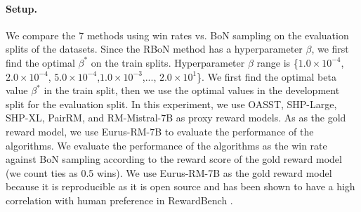 \paragraph{Setup.}
We compare the 7 methods using win rates vs. BoN sampling on the evaluation splits of the datasets. Since the RBoN method has a hyperparameter $\beta$, we first find the optimal $\beta^*$ on the train splits. 
Hyperparameter $\beta$
range is \{$1.0\times 10^{-4}$, $2.0\times 10^{-4}$, $5.0\times 10^{-4}$,$1.0\times 10^{-3}$,..., $2.0\times 10^1$\}.
We first find the optimal beta value $\beta^*$ in the train split, then we use the optimal values in the development split for the evaluation split.
In this experiment, we use OASST, SHP-Large, SHP-XL, PairRM, and RM-Mistral-7B as proxy reward models. As
as the gold reward model, we use Eurus-RM-7B to evaluate the performance of the algorithms. 
We evaluate the performance of the algorithms as the win rate against BoN sampling according to the reward score of the gold reward model (we count ties as 0.5 wins). We use Eurus-RM-7B as the gold reward model because it is reproducible as it is open source and has been shown to have a high correlation with human preference in RewardBench \citep{lambert2024rewardbench}.

